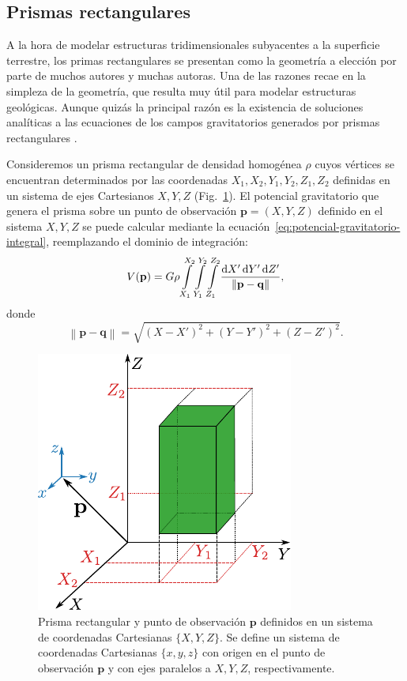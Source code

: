 \subsection{Prismas rectangulares}
\label{sec:prismas-rectangulares}

A la hora de modelar estructuras tridimensionales subyacentes a la superficie
terrestre, los primas rectangulares se presentan como la geometría a elección
por parte de muchos autores y muchas autoras.
Una de las razones recae en la simpleza de la geometría, que resulta muy útil
para modelar estructuras geológicas.
Aunque quizás la principal razón es la existencia de soluciones analíticas
a las ecuaciones de los campos gravitatorios generados por prismas
rectangulares \citep{nagy2000,nagy2002}.

Consideremos un prisma rectangular de densidad homogénea $\rho$ cuyos vértices
se encuentran determinados por las coordenadas $X_1, X_2, Y_1, Y_2, Z_1, Z_2$
definidas en un sistema de ejes Cartesianos ${X, Y, Z}$
(Fig.~\ref{fig:rectangular-prism}).
El potencial gravitatorio que genera el prisma sobre un punto de observación
$\mathbf{p} = (X, Y, Z)$ definido en el sistema ${X, Y, Z}$ se puede
calcular mediante la ecuación~\ref{eq:potencial-gravitatorio-integral},
reemplazando el dominio de integración:
%
\begin{equation}
    V(\mathbf{p}) =
    G \rho
    \int\limits_{X_1}^{X_2}
    \int\limits_{Y_1}^{Y_2}
    \int\limits_{Z_1}^{Z_2}
    \frac{\mathop{}\!\textnormal{d} X' \mathop{}\!\textnormal{d} Y' \mathop{}\!\textnormal{d} Z'}{\left\lVert \mathbf{p} - \mathbf{q}
        \right\rVert},
\end{equation}
%
donde
%
\begin{equation}
    \left\lVert \mathbf{p} - \mathbf{q} \right\rVert = \sqrt{
        (X - X')^2 + (Y - Y')^2 + (Z - Z')^2
    }.
\end{equation}

\begin{figure}[t]
    \centering
    \includegraphics[width=0.6\linewidth]{figs/rectangular-prism.pdf}
    \caption{
        Prisma rectangular y punto de observación $\mathbf{p}$ definidos en un
        sistema de coordenadas Cartesianas $\{X, Y, Z\}$. Se define un sistema
        de coordenadas Cartesianas $\{x, y, z\}$ con origen en el punto de
        observación $\mathbf{p}$ y con ejes paralelos a $X, Y, Z$,
        respectivamente.
    }
    \label{fig:rectangular-prism}
\end{figure}

